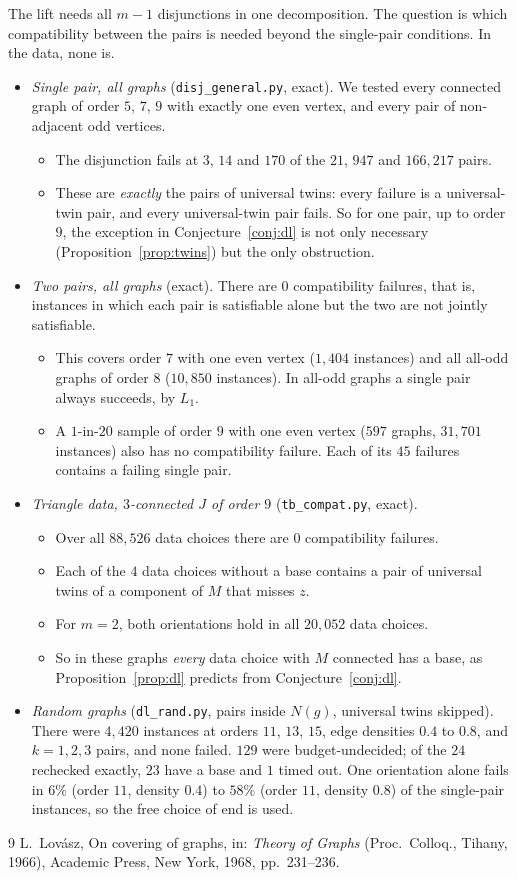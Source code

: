 \documentclass[11pt]{amsart}
\theoremstyle{definition}
\newcommand{\DLNINE}{$170$}
\newcommand{\DLTWONINE}{A $1$-in-$20$ sample of order $9$ with one even vertex ($597$ graphs, $31{,}701$ instances) also has no compatibility failure. Each of its $45$ failures contains a failing single pair.}
\newcommand{\DLRANDOM}{There were $4{,}420$ instances at orders $11$, $13$, $15$, edge densities $0.4$ to $0.8$, and $k=1,2,3$ pairs, and none failed. $129$ were budget-undecided; of the $24$ rechecked exactly, $23$ have a base and $1$ timed out. One orientation alone fails in $6\%$ (order $11$, density $0.4$) to $58\%$ (order $11$, density $0.8$) of the single-pair instances, so the free choice of end is used.}
\begin{document}
The lift needs all $m-1$ disjunctions in one decomposition. The question is which compatibility
between the pairs is needed beyond the single-pair conditions. In the data, none is.
\begin{itemize}[leftmargin=*]
\item \emph{Single pair, all graphs} (\texttt{disj\_general.py}, exact). We tested every connected graph
of order $5$, $7$, $9$ with exactly one even vertex, and every pair of non-adjacent odd vertices.
\begin{itemize}
\item The disjunction fails at $3$, $14$ and \DLNINE{} of the $21$, $947$ and $166{,}217$ pairs.
\item These are \emph{exactly} the pairs of universal twins: every failure is a universal-twin pair,
and every universal-twin pair fails. So for one pair, up to order $9$, the exception in
Conjecture~\ref{conj:dl} is not only necessary (Proposition~\ref{prop:twins}) but the only
obstruction.
\end{itemize}
\item \emph{Two pairs, all graphs} (exact). There are $0$ compatibility failures, that is, instances in
which each pair is satisfiable alone but the two are not jointly satisfiable.
\begin{itemize}
\item This covers order $7$ with one even vertex ($1{,}404$ instances) and all all-odd graphs of
order $8$ ($10{,}850$ instances). In all-odd graphs a single pair always succeeds, by $L_1$.
\item \DLTWONINE
\end{itemize}
\item \emph{Triangle data, $3$-connected $J$ of order $9$} (\texttt{tb\_compat.py}, exact).
\begin{itemize}
\item Over all $88{,}526$ data choices there are $0$ compatibility failures.
\item Each of the $4$ data choices without a base contains a pair of universal twins of a component of
$M$ that misses $z$.
\item For $m=2$, both orientations hold in all $20{,}052$ data choices.
\item So in these graphs \emph{every} data choice with $M$ connected has a base, as
Proposition~\ref{prop:dl} predicts from Conjecture~\ref{conj:dl}.
\end{itemize}
\item \emph{Random graphs} (\texttt{dl\_rand.py}, pairs inside $N(g)$, universal twins skipped).
\DLRANDOM
\end{itemize}


\begin{thebibliography}{9}
 L.~Lov\'asz, On covering of graphs, in: \emph{Theory of Graphs} (Proc.\ Colloq.,
Tihany, 1966), Academic Press, New York, 1968, pp.~231--236.
\end{thebibliography}
\end{document}
